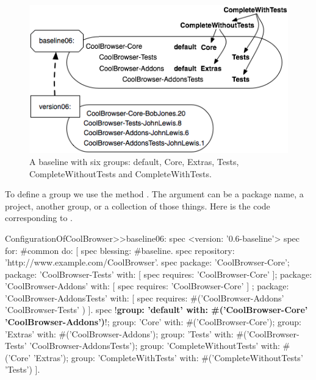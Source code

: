 \documentclass[a4paper,10pt,twoside]{book}
\begin{document}
\begin{figure}
\begin{center}
\includegraphics[width=0.9\linewidth]{version06}
\caption{A baseline with six groups: default, Core, Extras, Tests, CompleteWithoutTests and CompleteWithTests.\label{fig:version06}}
\end{center}
\end{figure} 


To define a group we use the method \mbox{.} The  argument can be a package name, a project, another group, or a collection of those things.  Here is the code corresponding to .

 
\begin{code}{}
ConfigurationOfCoolBrowser>>baseline06: spec 
     <version: '0.6-baseline'>
     spec for: #common do: [
          spec blessing: #baseline.
          spec repository: 'http://www.example.com/CoolBrowser'.
          spec 
                 package: 'CoolBrowser-Core';
                 package: 'CoolBrowser-Tests' with: [ spec requires: 'CoolBrowser-Core' ];
                 package: 'CoolBrowser-Addons' with: [ spec requires: 'CoolBrowser-Core' ] ;
                 package: 'CoolBrowser-AddonsTests' with: [ 
                      spec requires: #('CoolBrowser-Addons' 'CoolBrowser-Tests' ) ].
          spec 
                 !\textbf{group: 'default' with: \#('CoolBrowser-Core' 'CoolBrowser-Addons')}!;
                 group: 'Core' with: #('CoolBrowser-Core');
                 group: 'Extras' with: #('CoolBrowser-Addons');
                 group: 'Tests' with: #('CoolBrowser-Tests' 'CoolBrowser-AddonsTests');
                 group: 'CompleteWithoutTests' with: #('Core' 'Extras');
                 group: 'CompleteWithTests' with: #('CompleteWithoutTests' 'Tests')
               ].
\end{code}
\end{document}
